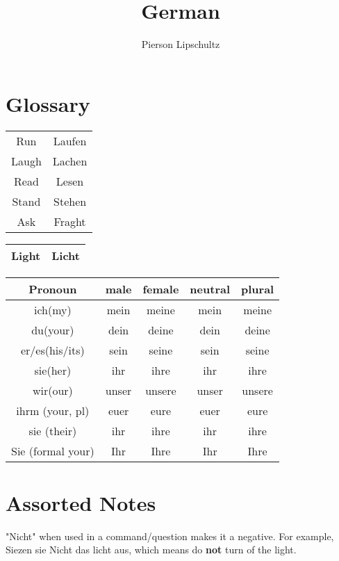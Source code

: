 \documentclass{article}
\title{German}
\author{Pierson Lipschultz}
\begin{document}
\maketitle

\section{Glossary}
\begin{center}
    \begin{tabular}{|c|c|}
        \hline
        Run & Laufen \\
        Laugh & Lachen \\
        Read & Lesen \\
        Stand & Stehen \\
        Ask & Fraght  \\
        \hline
    \end{tabular}
\end{center}

\begin{center}
    \begin{tabular}{|c|c|}
        \hline
        Light & Licht \\
        \hline
    \end{tabular}
\end{center}

\begin{center}
\begin{tabular}{|c|c|c|c|c|}
\hline
    Pronoun &male&female&neutral&plural \\
    \hline
    \hline
    ich(my)& mein & meine & mein & meine\\
    \hline
    du(your)&dein&deine&dein&deine \\
    \hline
    er/es(his/its)&sein&seine&sein&seine \\
    \hline
    sie(her)&ihr&ihre&ihr&ihre \\
    \hline
    wir(our)&unser&unsere&unser&unsere \\
    \hline
    ihrm (your, pl)&euer&eure&euer&eure \\
    \hline
    sie (their)&ihr&ihre&ihr&ihre \\
    \hline
    Sie (formal your)&Ihr&Ihre&Ihr&Ihre \\
\hline
\end{tabular}
\end{center}

\section{Assorted Notes}
"Nicht" when used in a command/question makes it a negative. For example, Siezen sie Nicht das licht aus, which means do \textbf{not} turn of the light. \\
\end{document}
